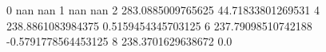 0 nan nan
1 nan nan
2 283.0885009765625 44.71833801269531
4 238.8861083984375 0.5159454345703125
6 237.79098510742188 -0.5791778564453125
8 238.3701629638672 0.0
